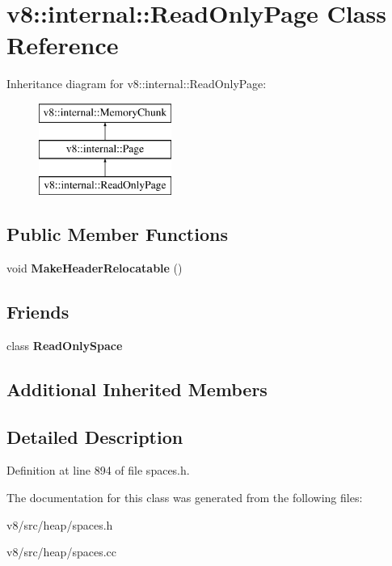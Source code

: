 \hypertarget{classv8_1_1internal_1_1ReadOnlyPage}{}\section{v8\+:\+:internal\+:\+:Read\+Only\+Page Class Reference}
\label{classv8_1_1internal_1_1ReadOnlyPage}
Inheritance diagram for v8\+:\+:internal\+:\+:Read\+Only\+Page\+:\begin{figure}[H]
\begin{center}
\leavevmode
\includegraphics[height=3.000000cm]{classv8_1_1internal_1_1ReadOnlyPage}
\end{center}
\end{figure}
\subsection*{Public Member Functions}
\begin{DoxyCompactItemize}
\item 
\mbox{\label{classv8_1_1internal_1_1ReadOnlyPage_afc4491800648fc91de2cea5eafcf9f27}} 
void {\bfseries Make\+Header\+Relocatable} ()
\end{DoxyCompactItemize}
\subsection*{Friends}
\begin{DoxyCompactItemize}
\item 
\mbox{\label{classv8_1_1internal_1_1ReadOnlyPage_a6ef47387fdea7194ea8bd1abbfd5cfee}} 
class {\bfseries Read\+Only\+Space}
\end{DoxyCompactItemize}
\subsection*{Additional Inherited Members}


\subsection{Detailed Description}


Definition at line 894 of file spaces.\+h.



The documentation for this class was generated from the following files\+:\begin{DoxyCompactItemize}
\item 
v8/src/heap/spaces.\+h\item 
v8/src/heap/spaces.\+cc\end{DoxyCompactItemize}
